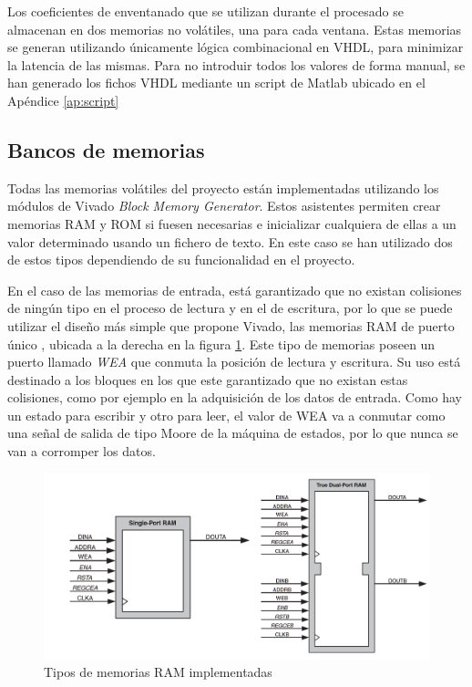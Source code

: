 Los coeficientes de enventanado que se utilizan durante el procesado se almacenan en dos memorias no volátiles, una para cada ventana. Estas memorias se generan utilizando únicamente lógica combinacional en VHDL, para minimizar la latencia de las mismas. Para no introduir todos los valores de forma manual, se han generado los fichos VHDL mediante un script de Matlab ubicado en el Apéndice \ref{ap:script}

\subsection{Bancos de memorias\label{memo}}
Todas las memorias volátiles del proyecto están implementadas utilizando los módulos de Vivado \emph{Block Memory Generator}. Estos asistentes permiten crear memorias RAM y ROM si fuesen necesarias e inicializar cualquiera de ellas a un valor determinado usando un fichero de texto. En este caso se han utilizado dos de estos tipos dependiendo de su funcionalidad en el proyecto.

En el caso de las memorias de entrada, está garantizado que no existan colisiones de ningún tipo en el proceso de lectura y en el de escritura, por lo que se puede utilizar el diseño más simple que propone Vivado, las memorias RAM de puerto único \cite{ram}, ubicada a la derecha en la figura \ref{fig:rams}. Este tipo de memorias poseen un puerto llamado \emph{WEA} que conmuta la posición de lectura y escritura. Su uso está destinado a los bloques en los que este garantizado que no existan estas colisiones, como por ejemplo en la adquisición de los datos de entrada. Como hay un estado para escribir y otro para leer, el valor de WEA va a conmutar como una señal de salida de tipo Moore de la máquina de estados, por lo que nunca se van a corromper los datos.

\begin{figure}[!b]
\begin{center}
\includegraphics[width=12cm]{img/rams.png}
\caption{\label{fig:rams}Tipos de memorias RAM implementadas}
\end{center}
\end{figure}

